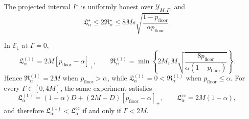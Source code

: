 The projected interval \(I^\star\) is uniformly honest over \(\mathcal Y_{M,\Gamma}\), and
\[
\mathfrak L_\alpha^\star\le2\mathfrak R_\alpha^\star
\le 8Ms\sqrt{\frac{1-p_{\mathrm{floor}}}{\alpha p_{\mathrm{floor}}}}.
\]

In \(\mathcal E_1\) at \(\Gamma=0\),
\[
\mathfrak L_\alpha^{(1)}=2M[p_{\mathrm{floor}}-\alpha]_+,
\qquad
\mathfrak R_\alpha^{(1)}=\min\left\{2M,
M\sqrt{\frac{8p_{\mathrm{floor}}}{\alpha(1-p_{\mathrm{floor}})}}\right\}.
\]
Hence \(\mathfrak R_\alpha^{(1)}=2M\) when \(p_{\mathrm{floor}}>\alpha\), while \(\mathfrak L_\alpha^{(1)}=0<\mathfrak R_\alpha^{(1)}\) when \(p_{\mathrm{floor}}\le\alpha\).  For every \(\Gamma\in[0,4M]\), the same experiment satisfies
\[
\mathfrak L_\alpha^{(1)}=(1-\alpha)D+(2M-D)[p_{\mathrm{floor}}-\alpha]_+,
\qquad
\mathfrak L_\alpha^{\mathrm{cc}}=2M(1-\alpha),
\]
and therefore \(\mathfrak L_\alpha^{(1)}<\mathfrak L_\alpha^{\mathrm{cc}}\) if and only if \(\Gamma<2M\).
